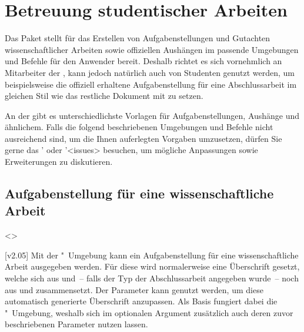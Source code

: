 \chapter[%
  Das Paket \Package*{tudscrsupervisor} -- Studentische Betreuung%
]{%
  Betreuung studentischer Arbeiten%
}
\begin{DeclareEntity}{}
%
Das Paket  stellt für das Erstellen von 
Aufgabenstellungen und Gutachten wissenschaftlicher Arbeiten sowie offiziellen 
Aushängen im \CD passende Umgebungen und Befehle für den Anwender bereit. 
Deshalb richtet es sich vornehmlich an Mitarbeiter der \TnUD, kann jedoch 
natürlich auch von Studenten genutzt werden, um beispielsweise die offiziell 
erhaltene Aufgabenstellung für eine Abschlussarbeit im gleichen Stil wie das 
restliche Dokument mit  zu setzen.

An der \TUD gibt es unterschiedlichste Vorlagen für Aufgabenstellungen, 
Aushänge und ähnlichem. Falls die folgend beschriebenen Umgebungen und Befehle 
nicht ausreichend sind, um die Ihnen auferlegten Vorgaben umzusetzen, dürfen 
Sie gerne das \Forum' oder \GitHubRepo'<issues> besuchen, um mögliche 
Anpassungen sowie Erweiterungen zu diskutieren.



\section{%
  Aufgabenstellung für eine wissenschaftliche Arbeit%
}
%
\begin{Declaration}
  {}
  <>
\begin{Declaration}
  {}
\begin{Declaration}
  {}
  [v2.05]
\printdeclarationlist
%
Mit der "~Umgebung kann ein Aufgabenstellung für eine 
wissenschaftliche Arbeit ausgegeben werden. Für diese wird normalerweise eine 
Überschrift gesetzt, welche sich aus  und~-- falls der Typ der 
Abschlussarbeit angegeben wurde~-- noch aus  und  
zusammensetzt. Der Parameter  kann genutzt werden, 
um diese automatisch generierte Überschrift anzupassen. Als Basis fungiert 
dabei die "~Umgebung, weshalb sich im optionalen Argument 
zusätzlich auch deren zuvor beschriebenen Parameter nutzen lassen.


\end{Declaration}
\end{Declaration}
\end{Declaration}
\end{DeclareEntity}
